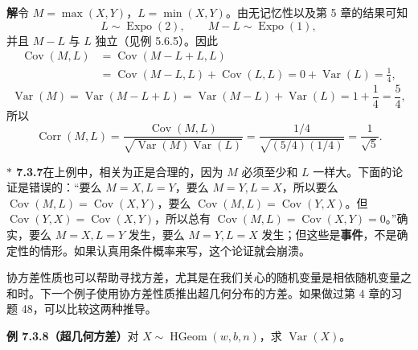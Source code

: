 \documentclass[UTF8,12pt,a4paper,fontset=fandol]{ctexart}
\newcommand{\biohazard}{\ensuremath{\ast}}
\begin{document}
\noindent\textbf{解}\quad 令 $M=\max(X,Y)$，$L=\min(X,Y)$。由无记忆性以及第 5 章的结果可知
\[
  L\sim \operatorname{Expo}(2),\qquad
  M-L\sim \operatorname{Expo}(1),
\]
并且 $M-L$ 与 $L$ 独立（见例 5.6.5）。因此
\[
\begin{aligned}
  \operatorname{Cov}(M,L)
  &=\operatorname{Cov}(M-L+L,L)\\
  &=\operatorname{Cov}(M-L,L)+\operatorname{Cov}(L,L)
  =0+\operatorname{Var}(L)=\frac14,
\end{aligned}
\]
\[
  \operatorname{Var}(M)
  =\operatorname{Var}(M-L+L)
  =\operatorname{Var}(M-L)+\operatorname{Var}(L)
  =1+\frac14=\frac54,
\]
所以
\[
  \operatorname{Corr}(M,L)
  =\frac{\operatorname{Cov}(M,L)}
  {\sqrt{\operatorname{Var}(M)\operatorname{Var}(L)}}
  =\frac{1/4}{\sqrt{(5/4)(1/4)}}=\frac{1}{\sqrt5}.
\]

\noindent\textbf{$\biohazard$ 7.3.7}\quad 在上例中，相关为正是合理的，因为 $M$ 必须至少和 $L$ 一样大。下面的论证是错误的：“要么 $M=X,L=Y$，要么 $M=Y,L=X$，所以要么 $\operatorname{Cov}(M,L)=\operatorname{Cov}(X,Y)$，要么 $\operatorname{Cov}(M,L)=\operatorname{Cov}(Y,X)$。但 $\operatorname{Cov}(Y,X)=\operatorname{Cov}(X,Y)$，所以总有 $\operatorname{Cov}(M,L)=\operatorname{Cov}(X,Y)=0$。”确实，要么 $M=X,L=Y$ 发生，要么 $M=Y,L=X$ 发生；但这些是\textbf{事件}，不是确定性的情形。如果认真用条件概率来写，这个论证就会崩溃。

协方差性质也可以帮助寻找方差，尤其是在我们关心的随机变量是相依随机变量之和时。下一个例子使用协方差性质推出超几何分布的方差。如果做过第 4 章的习题 48，可以比较这两种推导。

\noindent\textbf{例 7.3.8（超几何方差）}\quad 对 $X\sim \operatorname{HGeom}(w,b,n)$，求 $\operatorname{Var}(X)$。
\end{document}
